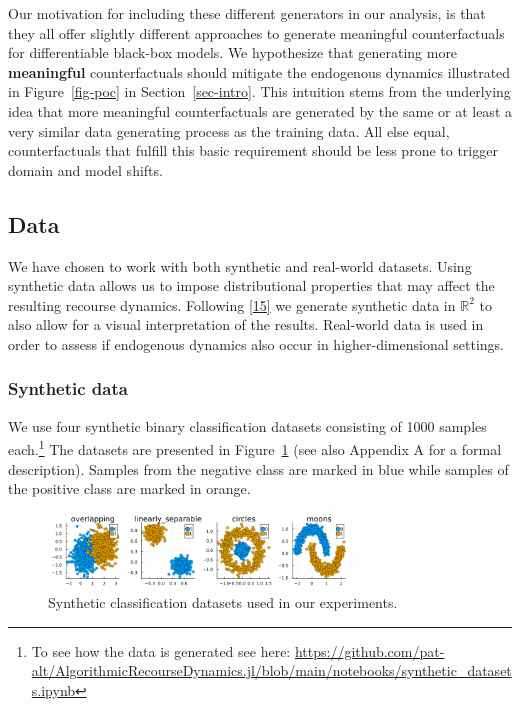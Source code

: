 \documentclass[
  conference]{IEEEtran}
\begin{document}
Our motivation for including these different generators in our analysis,
is that they all offer slightly different approaches to generate
meaningful counterfactuals for differentiable black-box models. We
hypothesize that generating more \textbf{meaningful} counterfactuals
should mitigate the endogenous dynamics illustrated in
Figure~\ref{fig-poc} in Section~\ref{sec-intro}. This intuition stems
from the underlying idea that more meaningful counterfactuals are
generated by the same or at least a very similar data generating process
as the training data. All else equal, counterfactuals that fulfill this
basic requirement should be less prone to trigger domain and model
shifts.

\hypertarget{sec-empirical-data}{%
\subsection{Data}\label{sec-empirical-data}}

We have chosen to work with both synthetic and real-world datasets.
Using synthetic data allows us to impose distributional properties that
may affect the resulting recourse dynamics. Following
\protect\hyperlink{ref-upadhyay2021towards}{{[}15{]}} we generate
synthetic data in \(\mathbb{R}^2\) to also allow for a visual
interpretation of the results. Real-world data is used in order to
assess if endogenous dynamics also occur in higher-dimensional settings.

\hypertarget{synthetic-data}{%
\subsubsection{Synthetic data}\label{synthetic-data}}

We use four synthetic binary classification datasets consisting of 1000
samples each.\footnote{To see how the data is generated see here:
  \url{https://github.com/pat-alt/AlgorithmicRecourseDynamics.jl/blob/main/notebooks/synthetic_datasets.ipynb}}
The datasets are presented in Figure~\ref{fig-synthetic-data} (see also
Appendix A for a formal description). Samples from the negative class
are marked in blue while samples of the positive class are marked in
orange.

\begin{figure}

{\centering \includegraphics[width=8cm,height=2cm]{www/synthetic_data.png}

}

\caption{\label{fig-synthetic-data}Synthetic classification datasets
used in our experiments.}

\end{figure}
\end{document}
